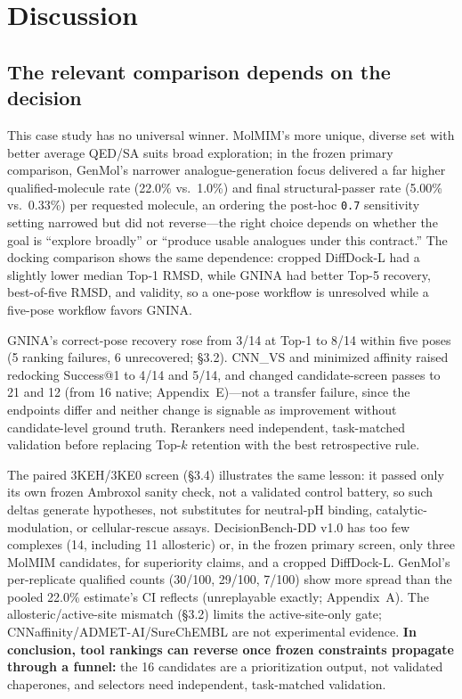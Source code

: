 \documentclass{article}
\begin{document}
\section{Discussion}

\subsection{The relevant comparison depends on the decision}

This case study has no universal winner. MolMIM's more unique, diverse set with better average QED/SA suits broad exploration; in the frozen primary comparison, GenMol's narrower analogue-generation focus delivered a far higher qualified-molecule rate (22.0\% vs.\ 1.0\%) and final structural-passer rate (5.00\% vs.\ 0.33\%) per requested molecule, an ordering the post-hoc \texttt{0.7} sensitivity setting narrowed but did not reverse---the right choice depends on whether the goal is ``explore broadly'' or ``produce usable analogues under this contract.'' The docking comparison shows the same dependence: cropped DiffDock-L had a slightly lower median Top-1 RMSD, while GNINA had better Top-5 recovery, best-of-five RMSD, and validity, so a one-pose workflow is unresolved while a five-pose workflow favors GNINA.

GNINA's correct-pose recovery rose from 3/14 at Top-1 to 8/14 within five poses (5 ranking failures, 6 unrecovered; \S3.2). CNN\_VS and minimized affinity raised redocking Success@1 to 4/14 and 5/14, and changed candidate-screen passes to 21 and 12 (from 16 native; Appendix~E)---not a transfer failure, since the endpoints differ and neither change is signable as improvement without candidate-level ground truth. Rerankers need independent, task-matched validation before replacing Top-$k$ retention with the best retrospective rule.

The paired 3KEH/3KE0 screen (\S3.4) illustrates the same lesson: it passed only its own frozen Ambroxol sanity check, not a validated control battery, so such deltas generate hypotheses, not substitutes for neutral-pH binding, catalytic-modulation, or cellular-rescue assays. DecisionBench-DD v1.0 has too few complexes (14, including 11 allosteric) or, in the frozen primary screen, only three MolMIM candidates, for superiority claims, and a cropped DiffDock-L. GenMol's per-replicate qualified counts (30/100, 29/100, 7/100) show more spread than the pooled 22.0\% estimate's CI reflects (unreplayable exactly; Appendix~A). The allosteric/active-site mismatch (\S3.2) limits the active-site-only gate; CNNaffinity/ADMET-AI/SureChEMBL are not experimental evidence. \textbf{In conclusion, tool rankings can reverse once frozen constraints propagate through a funnel:} the 16 candidates are a prioritization output, not validated chaperones, and selectors need independent, task-matched validation.
\end{document}
